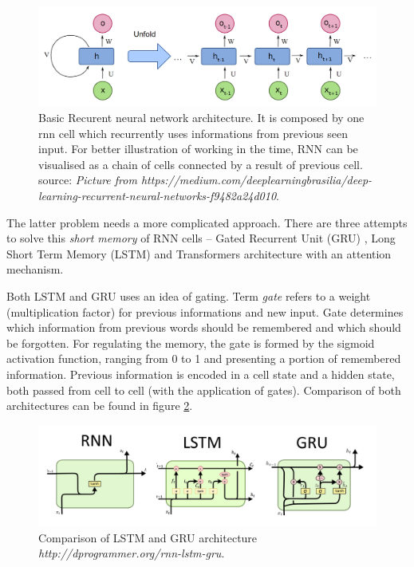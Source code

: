 \begin{figure}[h]
\centering
\includegraphics[width=1\columnwidth]{../img/rnn}
\protect\caption{Basic Recurent neural network architecture. It is composed by one rnn cell which recurrently uses informations from previous seen input. For better illustration of working in the time, RNN can be visualised as a chain of cells connected by a result of previous cell. source: \textit{Picture from https://medium.com/deeplearningbrasilia/deep-learning-recurrent-neural-networks-f9482a24d010}.}
\label{pic:rnn}
\end{figure}

The latter problem needs a more complicated approach. There are three attempts to solve this \textit{short memory} of RNN cells -- Gated Recurrent Unit (GRU) \citep{Cho2014}, Long Short Term Memory (LSTM) \citep{Hochreiter1997} and Transformers architecture \citep{Vaswani2017} with an attention mechanism.
\par
Both LSTM and GRU uses an idea of gating. Term \textit{gate} refers to a weight (multiplication factor) for previous informations and new input. Gate determines which information from previous words should be remembered and which should be forgotten. For regulating the memory, the gate is formed by the sigmoid activation function, ranging from 0 to 1 and presenting a portion of remembered information. Previous information is encoded in a cell state and a hidden state, both passed from cell to cell (with the application of gates). Comparison of both architectures can be found in figure \ref{pic:lstm_gru}.

\begin{figure}[h]
\centering
\includegraphics[width=1\columnwidth]{../img/lstm_gru}
\protect\caption{Comparison of LSTM and GRU architecture \textit{http://dprogrammer.org/rnn-lstm-gru}.}
\label{pic:lstm_gru}
\end{figure}

